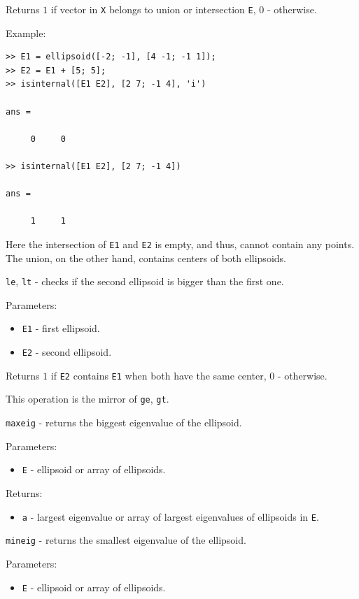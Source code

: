 \documentclass{report}
\begin{document}
Returns $1$ if vector in {\tt X} belongs to union or intersection {\tt E},
$0$ - otherwise.

Example:
{\tt \begin{verbatim}
>> E1 = ellipsoid([-2; -1], [4 -1; -1 1]);
>> E2 = E1 + [5; 5];
>> isinternal([E1 E2], [2 7; -1 4], 'i')

ans =

     0     0

>> isinternal([E1 E2], [2 7; -1 4])

ans =

     1     1
\end{verbatim} }
Here the intersection of {\tt E1} and {\tt E2} is empty, and thus, cannot
contain any points. The union, on the other hand, contains centers
of both ellipsoids.

\newpage

{\Large {\tt le}}, {\Large {\tt lt}} - checks if the second ellipsoid is bigger
than the first one.

Parameters:
\begin{itemize}
\item {\tt E1} - first ellipsoid.
\item {\tt E2} - second ellipsoid.
\end{itemize}

Returns $1$ if {\tt E2} contains {\tt E1} when both have the same center,
$0$ - otherwise.

This operation is the mirror of {\tt ge}, {\tt gt}.

\newpage

{\Large {\tt maxeig}} - returns the biggest eigenvalue of the ellipsoid.

Parameters:
\begin{itemize}
\item {\tt E} - ellipsoid or array of ellipsoids.
\end{itemize}

Returns:
\begin{itemize}
\item {\tt a} - largest eigenvalue or array of largest eigenvalues of
ellipsoids in {\tt E}.
\end{itemize}

\newpage

{\Large {\tt mineig}} - returns the smallest eigenvalue of the ellipsoid.

Parameters:
\begin{itemize}
\item {\tt E} - ellipsoid or array of ellipsoids.
\end{itemize}
\end{document}
